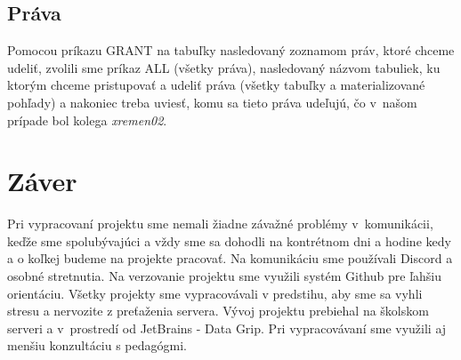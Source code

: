 \documentclass[a4paper, 11pt]{article}
\begin{document}
	\subsection{Práva}
	Pomocou príkazu GRANT na tabuľky nasledovaný zoznamom práv, ktoré chceme udeliť, zvolili sme príkaz ALL (všetky práva), nasledovaný názvom tabuliek, ku ktorým chceme pristupovať a udeliť práva (všetky tabuľky a materializované pohľady) a nakoniec treba uviesť, komu sa tieto práva udeľujú, čo v~našom prípade bol kolega \textit{xremen02}.

	\section{Záver}
	Pri vypracovaní projektu sme nemali žiadne závažné problémy v~komunikácii, keďže sme spolubývajúci a vždy sme sa dohodli na kontrétnom dni a hodine kedy a o koľkej budeme na projekte pracovať. Na komunikáciu sme používali Discord a osobné stretnutia. Na verzovanie projektu sme využili systém Github pre ľahšiu orientáciu. Všetky projekty sme vypracovávali v predstihu, aby sme sa vyhli stresu a nervozite z preťaženia servera. Vývoj projektu prebiehal na školskom serveri a v~prostredí od JetBrains \-- Data Grip. Pri vypracovávaní sme využili aj menšiu konzultáciu s pedagógmi.
\end{document}
